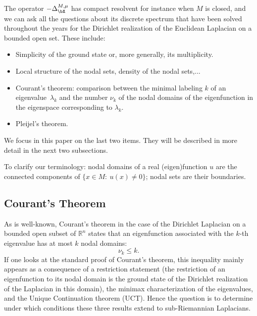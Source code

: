 The operator $-\Delta_\bX^{M,\mu}$ has compact resolvent for instance when $M$ is closed, and we can ask all the questions about its discrete spectrum that have been solved throughout the years for the Dirichlet realization of the Euclidean Laplacian on a bounded open set. These include:
\begin{itemize}
\item Simplicity of the ground state or, more generally, its multiplicity.
\item Local structure of the nodal sets, density of the nodal sets,...
\item Courant's theorem: comparison between the minimal labeling $ k$ of an eigenvalue~$\lambda_k$ and the number $\nu_k$ of the nodal domains of the eigenfunction in the eigenspace corresponding to $\lambda_k$.
\item Pleijel's theorem.
\end{itemize}
We focus in this paper on the last two items. They will be described in more detail in the next two subsections.

To clarify our terminology: nodal domains of a real (eigen)function $u$ are the connected components of $\{ x\in M:\ u(x) \neq 0\}$; nodal sets are their boundaries.

\subsection{Courant's Theorem}
As is well-known, Courant's theorem in the case of the Dirichlet Laplacian on a bounded open subset of $\mathbb R^n$ states that an eigenfunction associated with the $k$-th eigenvalue has at most $k$ nodal domains:
\[
\nu_k \leq k.
\]
If one looks at the standard proof of Courant's theorem, this inequality mainly appears as a consequence of a restriction statement (the restriction of an eigenfunction to its nodal domain is the ground state of the Dirichlet realization of the Laplacian in this domain), the minimax characterization of the eigenvalues, and the Unique Continuation theorem (UCT). Hence the question is to determine under which conditions these three results extend to sub-Riemannian Laplacians.

